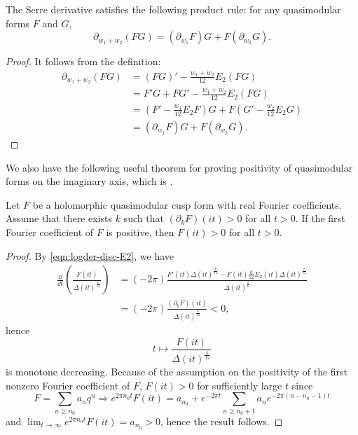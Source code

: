 \begin{theorem}\label{thm:serre-der-prod-rule}  \leanok
The Serre derivative satisfies the following product rule: for any quasimodular forms $F$ and $G$,
\begin{equation}
    \partial_{w_1 + w_2} (FG) = (\partial_{w_1}F)G + F (\partial_{w_2}G).
\end{equation}
\end{theorem}
\begin{proof}
    \leanok
    It follows from the definition:
    \begin{align}
        \partial_{w_1 + w_2} (FG) &= (FG)' - \frac{w_1 + w_2}{12} E_2 (FG) \\
        &= F'G + FG' - \frac{w_1 + w_2}{12} E_2(FG) \\
        &= \left(F' - \frac{w_1}{12}E_2 F\right)G + F \left(G' - \frac{w_2}{12}E_2 G\right) \\
        &= (\partial_{w_1}F)G + F(\partial_{w_2}G).
    \end{align}
\end{proof}

We also have the following useful theorem for proving positivity of quasimodular forms on the imaginary axis, which is \cite[Proposition 3.5, Corollary 3.6]{Lee}.
\begin{theorem}\label{thm:anti-serre-der-pos}
Let $F$ be a holomorphic quasimodular cusp form with real Fourier coefficients.
Assume that there exists $k$ such that $(\partial_{k}F)(it) > 0$ for all $t > 0$.
If the first Fourier coefficient of $F$ is positive, then $F(it) > 0$ for all $t > 0$.
\end{theorem}
\begin{proof}
By \eqref{eqn:logder-disc-E2}, we have
\begin{align}
    \frac{\dd}{\dd t} \left( \frac{F(it)}{\Delta(it)^{\frac{k}{12}}}\right)
    &= (-2 \pi) \frac{F'(it) \Delta(it)^{\frac{k}{12}} - F(it) \frac{k}{12} E_{2}(it) \Delta(it)^{\frac{k}{12}}}{\Delta(it)^{\frac{k}{6}}} \\
    &= (-2 \pi) \frac{(\partial_{k} F)(it)}{\Delta(it)^{\frac{k}{12}}}  < 0,
\end{align}
hence
\[
t \mapsto \frac{F(it)}{\Delta(it)^{\frac{k}{12}}}
\]
is monotone decreasing.
Because of the assumption on the positivity of the first nonzero Fourier coefficient of $F$, $F(it) > 0$ for sufficiently large $t$ since
\[
F = \sum_{n \geq n_{0}} a_{n} q^{n} \Rightarrow e^{2 \pi n_{0} t} F(it) = a_{n_{0}} + e^{-2 \pi t}\sum_{n\geq n_{0} + 1} a_{n} e^{-2 \pi (n - n_{0} - 1)t}
\]
and $\lim_{t \to \infty} e^{2 \pi n_{0}t} F(it) = a_{n_0} > 0$, hence the result follows.
\end{proof}


